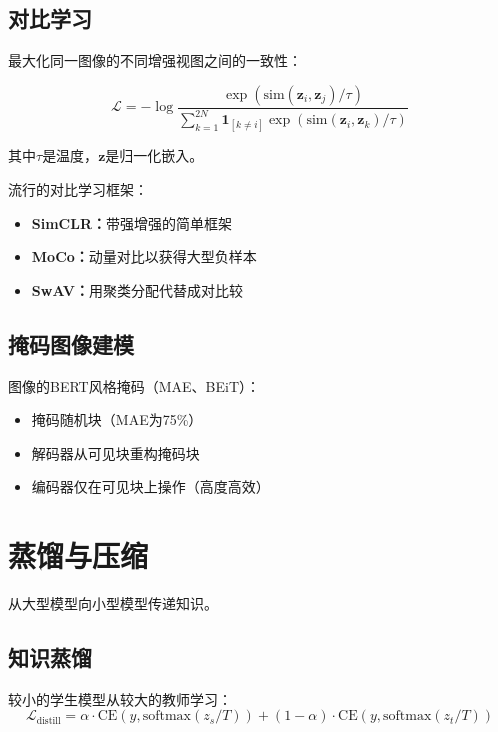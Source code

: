 \subsection{对比学习}

最大化同一图像的不同增强视图之间的一致性：

\begin{equation}
\mathcal{L} = -\log \frac{\exp(\text{sim}(\mathbf{z}_i, \mathbf{z}_j)/\tau)}{\sum_{k=1}^{2N} \mathbf{1}_{[k \neq i]} \exp(\text{sim}(\mathbf{z}_i, \mathbf{z}_k)/\tau)}
\end{equation}

其中$\tau$是温度，$\mathbf{z}$是归一化嵌入。

流行的对比学习框架：
\begin{itemize}
    \item \textbf{SimCLR：}带强增强的简单框架
    \item \textbf{MoCo：}动量对比以获得大型负样本
    \item \textbf{SwAV：}用聚类分配代替成对比较
\end{itemize}

\subsection{掩码图像建模}

图像的BERT风格掩码（MAE、BEiT）：
\begin{itemize}
    \item 掩码随机块（MAE为75\%）
    \item 解码器从可见块重构掩码块
    \item 编码器仅在可见块上操作（高度高效）
\end{itemize}

\section{蒸馏与压缩}

从大型模型向小型模型传递知识。

\subsection{知识蒸馏}

较小的学生模型从较大的教师学习：
\begin{equation}
\mathcal{L}_{\text{distill}} = \alpha \cdot \text{CE}(y, \text{softmax}(z_s/T)) + (1-\alpha) \cdot \text{CE}(y, \text{softmax}(z_t/T))
\end{equation}

